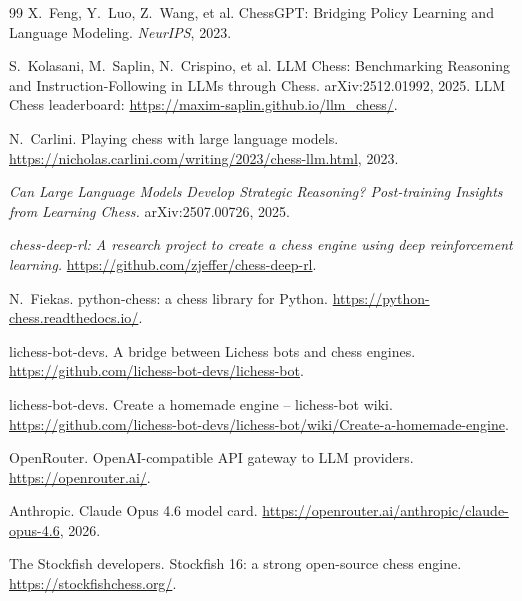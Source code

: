 \documentclass[11pt,a4paper]{article}
\begin{document}
\begin{thebibliography}{99}
X.\ Feng, Y.\ Luo, Z.\ Wang, et al.
\newblock ChessGPT: Bridging Policy Learning and Language Modeling.
\newblock \emph{NeurIPS}, 2023.

S.\ Kolasani, M.\ Saplin, N.\ Crispino, et al.
\newblock LLM Chess: Benchmarking Reasoning and Instruction-Following
in LLMs through Chess.
\newblock arXiv:2512.01992, 2025.
\newblock LLM Chess leaderboard: \url{https://maxim-saplin.github.io/llm_chess/}.

N.\ Carlini.
\newblock Playing chess with large language models.
\newblock \url{https://nicholas.carlini.com/writing/2023/chess-llm.html}, 2023.

\emph{Can Large Language Models Develop Strategic Reasoning?
Post-training Insights from Learning Chess.}
\newblock arXiv:2507.00726, 2025.

\emph{chess-deep-rl: A research project to create a chess engine
using deep reinforcement learning.}
\newblock \url{https://github.com/zjeffer/chess-deep-rl}.

N.\ Fiekas.
\newblock python-chess: a chess library for Python.
\newblock \url{https://python-chess.readthedocs.io/}.

lichess-bot-devs.
\newblock A bridge between Lichess bots and chess engines.
\newblock \url{https://github.com/lichess-bot-devs/lichess-bot}.

lichess-bot-devs.
\newblock Create a homemade engine -- lichess-bot wiki.
\newblock \url{https://github.com/lichess-bot-devs/lichess-bot/wiki/Create-a-homemade-engine}.

OpenRouter.
\newblock OpenAI-compatible API gateway to LLM providers.
\newblock \url{https://openrouter.ai/}.

Anthropic.
\newblock Claude Opus 4.6 model card.
\newblock \url{https://openrouter.ai/anthropic/claude-opus-4.6}, 2026.

The Stockfish developers.
\newblock Stockfish 16: a strong open-source chess engine.
\newblock \url{https://stockfishchess.org/}.

\end{thebibliography}
\end{document}
